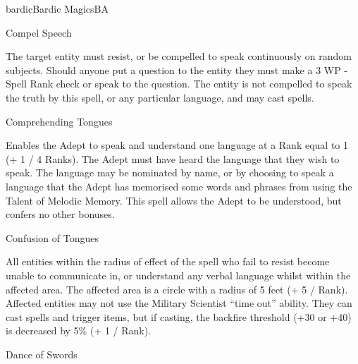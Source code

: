 \begin{college}[2.1]{bardic}{Bardic Magics}{BA}
\begin{spell}[S-2]{Compel Speech}

\begin{effects}
The target entity must resist, or be compelled to speak continuously
on random subjects. Should anyone put a question to the entity they
must make a 3 \x WP - Spell Rank check or speak to the question. The
entity is not compelled to speak the truth by this spell, or any
particular language, and may cast spells.
\end{effects}
\end{spell}

\begin{spell}[S-3]{Comprehending Tongues}

\begin{effects}
Enables the Adept to speak and understand one language at a Rank equal
to 1 (+ 1 / 4 Ranks). The Adept must have heard the language that they
wish to speak. The language may be nominated by name, or by choosing
to speak a language that the Adept has memorised some words and
phrases from using the Talent of Melodic Memory. This spell allows the
Adept to be understood, but confers no other bonuses.
\end{effects}
\end{spell}

\begin{spell}[S-4]{Confusion of Tongues}

\begin{effects}
All entities within the radius of effect of the spell who fail to
resist become unable to communicate in, or understand any verbal
language whilst within the affected area. The affected area is a
circle with a radius of 5 feet (+ 5 / Rank). Affected entities may not
use the Military Scientist ``time out'' ability.  They can cast spells
and trigger items, but if casting, the backfire threshold (\ie +30 or
+40) is decreased by 5\% (+ 1 / Rank).
\end{effects}
\end{spell}

\begin{spell}[S-5]{Dance of Swords}


\end{spell}
\end{college}
